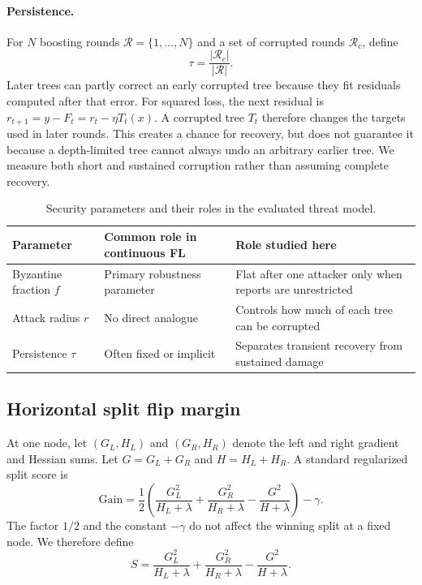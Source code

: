 \documentclass[11pt]{article}
\begin{document}
\paragraph{Persistence.}
For $N$ boosting rounds $\mathcal{R}=\{1,\ldots,N\}$ and a set of corrupted rounds $\mathcal{R}_c$, define
\begin{equation}
\tau=\frac{\lvert\mathcal{R}_c\rvert}{\lvert\mathcal{R}\rvert}.
\label{eq:taudef}
\end{equation}
Later trees can partly correct an early corrupted tree because they fit residuals computed after that error. For squared loss, the next residual is $r_{t+1}=y-F_t=r_t-\eta T_t(x)$. A corrupted tree $T_t$ therefore changes the targets used in later rounds. This creates a chance for recovery, but does not guarantee it because a depth-limited tree cannot always undo an arbitrary earlier tree. We measure both short and sustained corruption rather than assuming complete recovery.

\begin{table}[htbp]
\centering
\caption{Security parameters and their roles in the evaluated threat model.}
\begin{tabular}{p{3.0cm}p{4.5cm}p{5.4cm}}
\toprule
Parameter & Common role in continuous FL & Role studied here \\
\midrule
Byzantine fraction $f$ & Primary robustness parameter & Flat after one attacker only when reports are unrestricted \\
Attack radius $r$ & No direct analogue & Controls how much of each tree can be corrupted \\
Persistence $\tau$ & Often fixed or implicit & Separates transient recovery from sustained damage \\
\bottomrule
\end{tabular}
\label{tab:parameters}
\end{table}

\subsection{Horizontal split flip margin}
\label{sec:marginmethod}

At one node, let $(G_L,H_L)$ and $(G_R,H_R)$ denote the left and right gradient and Hessian sums. Let $G=G_L+G_R$ and $H=H_L+H_R$. A standard regularized split score is
\begin{equation}
\mathrm{Gain}
=\frac{1}{2}\left(
\frac{G_L^2}{H_L+\lambda}
+\frac{G_R^2}{H_R+\lambda}
-\frac{G^2}{H+\lambda}
\right)-\gamma.
\label{eq:gain}
\end{equation}
The factor $1/2$ and the constant $-\gamma$ do not affect the winning split at a fixed node. We therefore define
\[
S=\frac{G_L^2}{H_L+\lambda}
+\frac{G_R^2}{H_R+\lambda}
-\frac{G^2}{H+\lambda}.
\]
\end{document}

